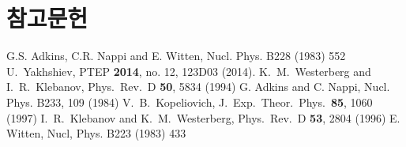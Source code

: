 \documentclass[superscriptaddress,
nofootinbib,byrevtex,fleqn,prd,12pt]{revtex4}
\begin{document}
\section{참고문헌}\label{6}
\begin{thebibliography}{References}
   G.S. Adkins, C.R. Nappi and E. Witten, Nucl. Phys. B228 (1983) 552%
      U.~Yakhshiev, PTEP {\bf 2014}, no. 12, 123D03 (2014).%
    K.~M.~Westerberg and I.~R.~Klebanov, Phys.\ Rev.\ D {\bf 50}, 5834 (1994)%
    G. Adkins and C. Nappi, Nucl. Phys. B233, 109 (1984)%
   V.~B.~Kopeliovich, J.\ Exp.\ Theor.\ Phys.\  {\bf 85}, 1060 (1997)%
    I.~R.~Klebanov and K.~M.~Westerberg, Phys.\ Rev.\ D {\bf 53}, 2804 (1996)%
  E. Witten, Nucl, Phys. B223 (1983) 433%
\end{thebibliography}
\end{document}
